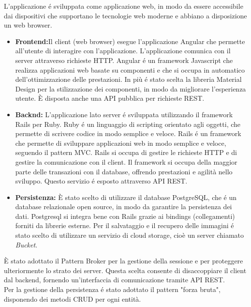L’applicazione é sviluppata come applicazione web, in modo da essere accessibile dai dispositivi che supportano le tecnologie web moderne e abbiano a disposizione un web browser.
\begin{itemize}
	\item \large{\textbf{Frontend:}}\newline Il client (web browser) esegue l'applicazione Angular che permette all'utente di interagire con l'applicazione. L'applicazione comunica con il server attraverso richieste HTTP. Angular é un framework Javascript che realizza applicazioni web basate su componenti e che si occupa in automatico dell'ottimizzazione delle prestazioni. In più é stato scelta la libreria Material Design per la stilizzazione dei componenti, in modo da migliorare l'esperienza utente. È disposta anche una API pubblica per richieste REST. 
	\item \large{\textbf{Backnd:}}\newline
	L'applicazione lato server é sviluppata utilizzando il framework Rails per Ruby. Ruby é un linguaggio di scripting orientato agli oggetti, che permette di scrivere codice in modo semplice e veloce. Rails é un framework che permette di sviluppare applicazioni web in modo semplice e veloce, seguendo il pattern MVC. Rails si occupa di gestire le richieste HTTP e di gestire la comunicazione con il client. Il framework si occupa della maggior parte delle transazioni con il database, offrendo prestazioni e agilità nello sviluppo. Questo servizio é esposto attraverso API REST.
	\item \large{\textbf{Persistenza:}}\newline
	È stato scelto di utilizzare il database PostgreSQL, che é un database relazionale open source, in modo da garantire la persistenza dei dati. Postgresql si integra bene con Rails grazie ai bindings (collegamenti) forniti da librerie esterne.
	Per il salvataggio e il recupero delle immagini é stato scelto di utilizzare un servizio di cloud storage, cioè un server chiamato \textit{Bucket}.
\end{itemize}

È stato adottato il Pattern Broker per la gestione della sessione e per proteggere ulteriormente lo strato dei server. Questa scelta consente di disaccoppiare il client dal backend, fornendo un'interfaccia di comunicazione tramite API REST.\\

Per la gestione della persistenza é stato adottato il pattern "forza bruta", disponendo dei metodi CRUD per ogni entità.\\

